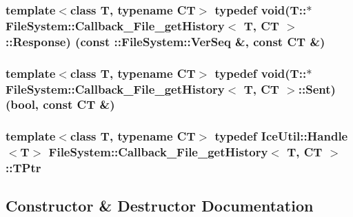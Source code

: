 \subsubsection[{Response}]{\setlength{\rightskip}{0pt plus 5cm}template$<$class T, typename C\+T$>$ typedef void(T\+::$\ast$ {\bf File\+System\+::\+Callback\+\_\+\+File\+\_\+get\+History}$<$ T, C\+T $>$\+::Response) (const \+::{\bf File\+System\+::\+Ver\+Seq} \&, const C\+T \&)}\label{class_file_system_1_1_callback___file__get_history_ab5a3b64e414e7c291f6b17ecadecd1db}
\hypertarget{class_file_system_1_1_callback___file__get_history_a9fc8d5d98e242cd24719b4d9727c75cf}{}
\subsubsection[{Sent}]{\setlength{\rightskip}{0pt plus 5cm}template$<$class T, typename C\+T$>$ typedef void(T\+::$\ast$ {\bf File\+System\+::\+Callback\+\_\+\+File\+\_\+get\+History}$<$ T, C\+T $>$\+::Sent) (bool, const C\+T \&)}\label{class_file_system_1_1_callback___file__get_history_a9fc8d5d98e242cd24719b4d9727c75cf}
\hypertarget{class_file_system_1_1_callback___file__get_history_aafd5b2465ab25e9e58402d052d89de42}{}
\subsubsection[{T\+Ptr}]{\setlength{\rightskip}{0pt plus 5cm}template$<$class T, typename C\+T$>$ typedef Ice\+Util\+::\+Handle$<$T$>$ {\bf File\+System\+::\+Callback\+\_\+\+File\+\_\+get\+History}$<$ T, C\+T $>$\+::{\bf T\+Ptr}}\label{class_file_system_1_1_callback___file__get_history_aafd5b2465ab25e9e58402d052d89de42}


\subsection{Constructor \& Destructor Documentation}
\hypertarget{class_file_system_1_1_callback___file__get_history_a099b4565f686da484102fcbe27eb6a6d}{}
